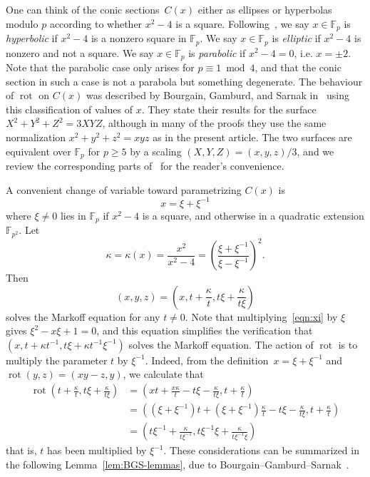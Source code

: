 \documentclass[AHL, Unicode, longabstracts, published]{cedram}
\newcommand{\F}{\mathbb{F}}
\DeclareMathOperator{\rot}{rot}
\begin{document}
One can think of the conic sections~$C(x)$ either as ellipses or hyperbolas modulo $p$ according to whether $x^2-4$ is a square. Following~\cite{BGS}, we say $x\in\F_{p}$ is \emph{hyperbolic} if $x^{2}-4$ is a nonzero square in $\F_{p}$. We say $x\in\F_{p}$ is \emph{elliptic} if $x^{2}-4$ is nonzero and not a square. We say $x\in\F_{p}$ is \emph{parabolic} if $x^{2}-4=0$, i.e. $x=\pm2$. Note that the parabolic case only arises for $p \equiv 1 \bmod 4$, and that the conic section in such a case is not a parabola but something degenerate. The behaviour of $\rot$ on $C(x)$ was described by Bourgain, Gamburd, and Sarnak in~\cite{BGS} using this classification of values of $x$. They state their results for the surface $X^2 + Y^2 + Z^2 = 3XYZ$, although in many of the proofs they use the same normalization $x^2 + y^2 + z^2 = xyz$ as in the present article. The two surfaces are equivalent over $\F_p$ for $p \geq 5$ by a scaling $(X,Y,Z) = (x,y,z)/3$, and we review the corresponding parts of~\cite{BGS} for the reader's convenience.

A convenient change of variable toward parametrizing $C(x)$ is
\begin{equation}\label{eqn:xi}
x = \xi + \xi^{-1}
\end{equation}
where $\xi \neq 0$ lies in $\F_p$ if $x^2-4$ is a square, and otherwise in a quadratic extension $\F_{p^2}$. Let
\begin{equation}\label{eqn:kappa}
\kappa = \kappa(x) = \frac{x^2}{x^2 - 4} = \left(\frac{ \xi + \xi^{-1} }{\xi - \xi^{-1}} \right)^2.
\end{equation}
Then
\[
(x,y,z) = \left(x, t + \frac{\kappa}{t}, t\xi + \frac{\kappa}{t\xi} \right)
\]
solves the Markoff equation for any $t \neq 0$. Note that multiplying~\eqref{eqn:xi} by $\xi$ gives $\xi^2 - x\xi + 1 = 0$, and this equation simplifies the verification that $(x,t+\kappa t^{-1}, t\xi + \kappa t^{-1}\xi^{-1})$ solves the Markoff equation. The action of $\rot$ is to multiply the parameter $t$ by $\xi^{-1}$. Indeed, from the definition~$x = \xi + \xi^{-1}$ and $\rot(y,z) = (xy-z,y)$, we calculate that
\begin{align*}
\rot \left(t + \frac{\kappa}{t}, t\xi + \frac{\kappa}{t\xi} \right) &= \left(xt + \frac{x\kappa}{t} - t\xi - \frac{\kappa}{t\xi}, t + \frac{\kappa }{t} \right) \\
&= \left((\xi+\xi^{-1})t + (\xi+\xi^{-1})\frac{\kappa}{t} - t\xi - \frac{\kappa}{t\xi}, t + \frac{\kappa}{t} \right) \\
&= \left(t\xi^{-1} + \frac{\kappa}{t\xi^{-1}}, t\xi^{-1} \xi + \frac{\kappa}{t\xi^{-1} \xi} \right)
\end{align*}
that is, $t$ has been multiplied by $\xi^{-1}$. These considerations can be summarized in the following Lemma~\ref{lem:BGS-lemmas}, due to Bourgain--Gamburd--Sarnak~\cite{BGS}.
\end{document}
